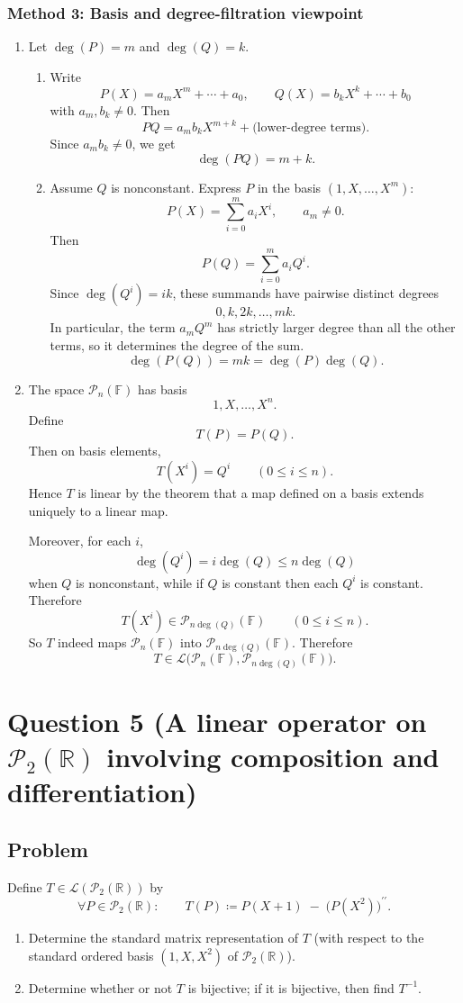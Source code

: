 \documentclass[12pt]{article}
\newcommand{\F}{\mathbb{F}}
\newcommand{\R}{\mathbb{R}}
\newcommand{\cL}{\mathcal{L}}
\newcommand{\cP}{\mathcal{P}}
\begin{document}
\subsubsection{Method 3: Basis and degree-filtration viewpoint}
\begin{enumerate}[label=(\alph*)]
\item Let \(\deg(P)=m\) and \(\deg(Q)=k\).

\begin{enumerate}[label=(\roman*)]
\item Write
\[
P(X)=a_mX^m+\cdots+a_0,\qquad
Q(X)=b_kX^k+\cdots+b_0
\]
with \(a_m,b_k\neq 0\). Then
\[
PQ=a_mb_kX^{m+k}+\text{(lower-degree terms)}.
\]
Since \(a_mb_k\neq 0\), we get
\[
\boxed{\deg(PQ)=m+k.}
\]

\item Assume \(Q\) is nonconstant. Express \(P\) in the basis \((1,X,\dots,X^m)\):
\[
P(X)=\sum_{i=0}^m a_iX^i,\qquad a_m\neq 0.
\]
Then
\[
P(Q)=\sum_{i=0}^m a_iQ^i.
\]
Since \(\deg(Q^i)=ik\), these summands have pairwise distinct degrees
\[
0,k,2k,\dots,mk.
\]
In particular, the term \(a_mQ^m\) has strictly larger degree than all the other terms, so it determines the degree of the sum.
\[
\boxed{\deg(P(Q))=mk=\deg(P)\deg(Q).}
\]
\end{enumerate}

\item The space \(\cP_n(\F)\) has basis
\[
1,X,\dots,X^n.
\]
Define
\[
T(P)=P(Q).
\]
Then on basis elements,
\[
T(X^i)=Q^i\qquad (0\le i\le n).
\]
Hence \(T\) is linear by the theorem that a map defined on a basis extends uniquely to a linear map.

Moreover, for each \(i\),
\[
\deg(Q^i)=i\deg(Q)\le n\deg(Q)
\]
when \(Q\) is nonconstant, while if \(Q\) is constant then each \(Q^i\) is constant. Therefore
\[
T(X^i)\in \cP_{n\deg(Q)}(\F)
\qquad (0\le i\le n).
\]
So \(T\) indeed maps \(\cP_n(\F)\) into \(\cP_{n\deg(Q)}(\F)\). Therefore
\[
\boxed{T\in \cL\bigl(\cP_n(\F),\cP_{n\deg(Q)}(\F)\bigr).}
\]
\end{enumerate}

\newpage
\section{Question 5 (A linear operator on \(\cP_2(\R)\) involving composition and differentiation)}
\subsection{Problem}
Define \(T\in \cL(\cP_2(\R))\) by
\[
\forall P\in\cP_2(\R):\qquad
T(P)\coloneqq P(X+1)\;-\;\bigl(P(X^2)\bigr)^{\prime\prime}.
\]
\begin{enumerate}[label=(\alph*)]
\item Determine the standard matrix representation of \(T\) (with respect to the standard ordered basis \((1,X,X^2)\) of \(\cP_2(\R)\)).
\item Determine whether or not \(T\) is bijective; if it is bijective, then find \(T^{-1}\).
\end{enumerate}
\end{document}
